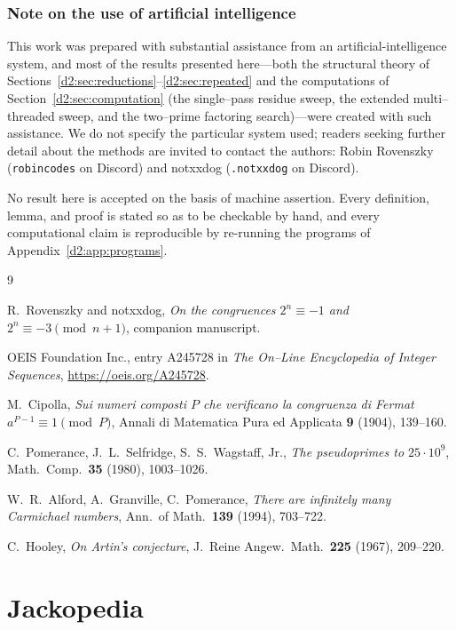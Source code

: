 \documentclass[a4paper]{article}
\theoremstyle{plain}
\theoremstyle{definition}
\theoremstyle{remark}
\begin{document}
\subsubsection{Note on the use of artificial intelligence}\label{d2:app:ai}
This work was prepared with substantial assistance from an artificial-intelligence system, and most of the results presented here---both the structural theory of Sections~\ref{d2:sec:reductions}--\ref{d2:sec:repeated} and the computations of Section~\ref{d2:sec:computation} (the single--pass residue sweep, the extended multi--threaded sweep, and the two--prime factoring search)---were created with such assistance. We do not specify the particular system used; readers seeking further detail about the methods are invited to contact the authors: Robin Rovenszky (\texttt{robincodes} on Discord) and notxxdog (\texttt{.notxxdog} on Discord).

No result here is accepted on the basis of machine assertion. Every definition, lemma, and proof is stated so as to be checkable by hand, and every computational claim is reproducible by re-running the programs of Appendix~\ref{d2:app:programs}.

\begin{thebibliography}{9}

R.~Rovenszky and notxxdog, \emph{On the congruences $2^{n}\equiv-1$ and $2^{n}\equiv-3\pmod{n+1}$}, companion manuscript.

OEIS Foundation Inc., entry A245728 in \emph{The On--Line Encyclopedia of Integer Sequences}, \url{https://oeis.org/A245728}.

M.~Cipolla, \emph{Sui numeri composti $P$ che verificano la congruenza di Fermat $a^{P-1}\equiv1\pmod P$}, Annali di Matematica Pura ed Applicata \textbf{9} (1904), 139--160.

C.~Pomerance, J.~L.~Selfridge, S.~S.~Wagstaff, Jr., \emph{The pseudoprimes to $25\cdot10^{9}$}, Math.\ Comp.\ \textbf{35} (1980), 1003--1026.

W.~R.~Alford, A.~Granville, C.~Pomerance, \emph{There are infinitely many Carmichael numbers}, Ann.\ of Math.\ \textbf{139} (1994), 703--722.

C.~Hooley, \emph{On Artin's conjecture}, J.\ Reine Angew.\ Math.\ \textbf{225} (1967), 209--220.

\end{thebibliography}


\section{Jackopedia}
\end{document}
